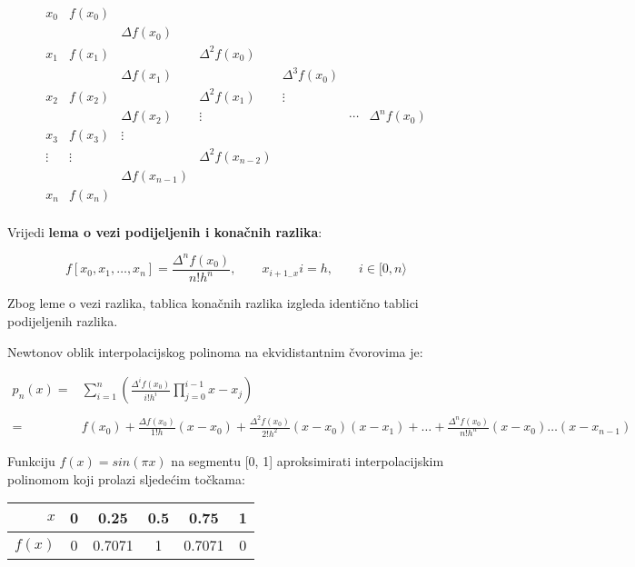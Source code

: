\begin{tablebox}
    $$
    \begin{array}{ccccccc}
        x_0 & f(x_0) \\
        & & \Delta f(x_0) \\
        x_1 & f(x_1) & & \Delta^2 f(x_0) \\
        & & \Delta f(x_1) & & \Delta^3 f(x_0) \\
        x_2 & f(x_2) & & \Delta^2 f(x_1) & \vdots \\
        & & \Delta f(x_2) & \vdots & & \cdots & \Delta^n f(x_0) \\
        x_3 & f(x_3) & \vdots \\
        \vdots & \vdots & & \Delta^2 f(x_{n-2}) \\
        & & \Delta f(x_{n-1}) \\
        x_n & f(x_n) \\
    \end{array}
    $$
\end{tablebox}

Vrijedi \textbf{lema o vezi podijeljenih i konačnih razlika}:

$$
f[x_0,x_1,\dots,x_n] = \frac{\Delta^nf(x_0)}{n!h^n},\qquad x_{i+1_-x}i=h,\qquad i\in [0,n\rangle
$$

Zbog leme o vezi razlika, tablica konačnih razlika izgleda identično tablici podijeljenih razlika.

Newtonov oblik interpolacijskog polinoma na ekvidistantnim čvorovima je:

\begin{align}
p_n(x) =& \sum_{i=1}^{n}\left(\frac{\Delta^if(x_0)}{i!h^i}\prod_{j=0}^{i-1}x-x_j\right)\\\nonumber\\
=&f(x_0)
+\frac{\Delta f(x_0)}{1!h}(x-x_0)
+\frac{\Delta^2 f(x_0)}{2!h^2}(x-x_0)(x-x_1)
+\dots
+\frac{\Delta^n f(x_0)}{n!h^n}(x-x_0)\dots(x-x_{n-1})\nonumber
\end{align}

\newpage

\begin{examplebox}
    Funkciju $f(x)=sin(\pi x)$ na segmentu [0, 1] aproksimirati interpolacijskim polinomom koji prolazi sljedećim točkama:

    \center
    \begin{tabular}{r|c|c|c|c|c}
        $x$ & 0 & 0.25 & 0.5 & 0.75 & 1\\
        \hline
        $f(x)$ & 0 & 0.7071 & 1 & 0.7071 & 0
    \end{tabular}
\end{examplebox}

